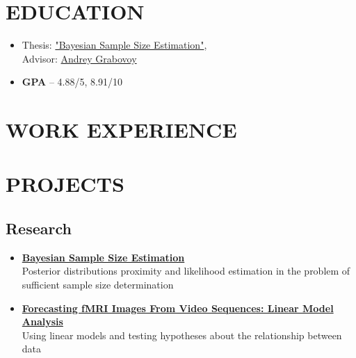 \documentclass[12pt]{moderncv}
\begin{document}
    \makecvtitle

    \section{EDUCATION}

        \begin{itemize}
            \item Thesis: \href{https://github.com/intsystems/Kiselev-BS-Thesis}{"Bayesian Sample Size Estimation"},\\
            Advisor: \href{https://andriygav.github.io}{Andrey Grabovoy}
            \item \textbf{GPA} -- 4.88/5, 8.91/10
        \end{itemize}

    \section{WORK EXPERIENCE}


        \section{PROJECTS}

        \subsection{Research}

        \begin{itemize}
            \item \href{https://github.com/kisnikser/Bayesian-Sample-Size-Estimation}{\textbf{Bayesian Sample Size Estimation}}\\
            Posterior distributions proximity and likelihood estimation in the problem of
            sufficient sample size determination
            \item \href{https://github.com/intsystems/2023-Project-112}{\textbf{Forecasting fMRI Images From Video Sequences: Linear Model Analysis}}\\
            Using linear models and testing hypotheses about the relationship between data
        \end{itemize}
\end{document}
